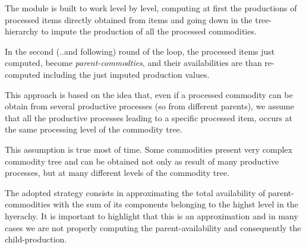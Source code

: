 \documentclass[nojss]{jss}
\begin{document}
The module is built to work level by level, computing at first the productions of processed items directly obtained from  items and going down in the tree-hierarchy to impute the production of all the processed commodities.

In the second (..and following) round of the loop, the processed items just computed, become \textit{parent-commodties}, and their availabilities are than re-computed including the just imputed production values.

This approach is based on the idea that, even if a processed commodity can be obtain from several productive processes (so from different parents), we assume that all the productive processes leading to a specific processed item, occurs at the same processing level of the commodity tree. 

This assumption is true most of time.
Some commodities present very complex commodity tree and can be obtained not only as result of many productive processes, but at many different levels of the commodity tree.


The adopted strategy consists in approximating the total availability of parent-commodities with the sum of its components belonging to the highst level in the hyerachy. It is important to highlight that this is an approximation and in many cases we are not properly computing the parent-availability and consequently the child-production.
\end{document}
